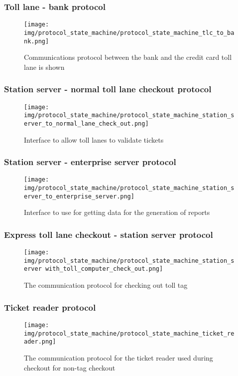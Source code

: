 \subsubsection*{Toll lane - bank protocol}
\begin{figure}[H]
\centering
\texttt{[image: img/protocol\_state\_machine/protocol\_state\_machine\_tlc\_to\_bank.png]}
\caption{Communications protocol between the bank and the credit card toll lane is shown}
\label{fig:protocol_state_machine_tlc_to_bank}
\end{figure}

\subsubsection*{Station server - normal toll lane checkout protocol}
\begin{figure}[H]
\centering
\texttt{[image: img/protocol\_state\_machine/protocol\_state\_machine\_station\_server\_to\_normal\_lane\_check\_out.png]}
\caption{Interface to allow toll lanes to validate tickets}
\label{fig:protocol_state_machine_station_server_to_normal_lane_check_out}
\end{figure}

\subsubsection*{Station server - enterprise server protocol}
\begin{figure}[H]
\centering
\texttt{[image: img/protocol\_state\_machine/protocol\_state\_machine\_station\_server\_to\_enterprise\_server.png]}
\caption{Interface to use for getting data for the generation of reports}
\label{fig:protocol_state_machine_station_server_to_enterprise_server}
\end{figure}

\subsubsection*{Express toll lane checkout - station server protocol}
\begin{figure}[H]
\centering
\texttt{[image: img/protocol\_state\_machine/protocol\_state\_machine\_station\_server with\_toll\_computer\_check\_out.png]}
\caption{The communication protocol for checking out toll tag}
\label{fig:protocol_state_machine_station_server with_toll_computer_check_out}
\end{figure}

\subsubsection*{Ticket reader protocol}
\begin{figure}[H]
\centering
\texttt{[image: img/protocol\_state\_machine/protocol\_state\_machine\_ticket\_reader.png]}
\caption{The communication protocol for the ticket reader used during checkout for non-tag checkout}
\label{fig:protocol_state_machine_ticket_reader}
\end{figure}

